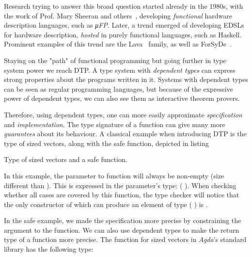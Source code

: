     Research trying to answer this broad question started already in the 1980s,
    with the work of Prof. Mary Sheeran and others~\cite{sheeran-survey},
    developing \emph{functional} hardware description languages, such as \emph{μFP}.
    Later, a trend emerged of developing \acp{EDSL} for hardware description,
    \emph{hosted} in purely functional languages, such as Haskell.
    Prominent examples of this trend are the Lava~\cite{lava-1999} family,
    as well as ForSyDe~\cite{forsyde1999}.

    Staying on the "path" of functional programming but going further in type system power we reach \ac{DTP}.
    A type system with \emph{dependent types} can express strong properties about the programs written in it.
    Systems with dependent types can be seen as regular programming languages,
    but because of the expressive power of dependent types, we can also see them as interactive theorem provers.

    Therefore, using dependent types,
    one can more easily approximate \emph{specification} and \emph{implementation}.
    The type signature of a function can give many more \emph{guarantees} about its behaviour.
    A classical example when introducing \ac{DTP} is the type of sized vectors,
    along with the safe  function, depicted in listing

    \begin{listing}[h]
        \caption{Type of sized vectors and a safe  function. \label{lst:Vect-head}}
    \end{listing}

    In this example, the parameter to  function will always be non-empty (size different than ).
    This is expressed in the parameter's type:   ( ).
    When checking whether all cases are covered by this function, the type checker will notice that
    the only constructor of  which can produce an element of type   ( ) is .

    In the safe  example, we made the specification more precise by constraining the argument to the function.
    We can also use dependent types to make the return type of a function more precise.
    The  function for sized vectors in \emph{Agda}'s standard library has the following type:

